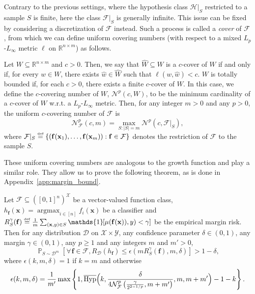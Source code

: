 \documentclass[twoside,11pt]{article}
\newcommand{\Id}[1]{\mathds{1}\hspace{-2.5pt}\left[#1\right]}
\let\oldforall=\forall
\renewcommand{\forall}{\hspace{1pt}\oldforall\hspace{1pt}}
\newcommand{\pr}[1]{\left(#1\right)}
\newcommand{\cb}[1]{\left\{#1\right\}}
\newcommand{\abs}[1]{\left|#1\right|}
\newcommand{\D}{\mathcal{D}}
\newcommand{\F}{\mathcal{F}}
\newcommand{\f}{\mathbf{f}}
\renewcommand{\H}{{\mathcal{H}}}
\newcommand{\N}{\mathcal{N}}
\newcommand{\x}{\mathbf{x}}
\newcommand{\X}{\mathcal{X}}
\newcommand{\Y}{\mathcal{Y}}
\newcommand{\reals}{\mathds{R}}
\newcommand{\eqdef}{\overset{\smash{\mbox{\tiny \rm def}}}{=}}
\DeclareMathOperator*{\Prob}{\mathds{P}}
\newcommand{\prob}[2]{\Prob_{#1}\left[#2\right]}
\DeclareMathOperator*{\argmax}{argmax}
\newcommand{\HypInv}{\overline{\textnormal{Hyp}}}
\begin{document}
Contrary to the previous settings, where the hypothesis class $\H|_S$ restricted to a sample $S$ is finite, here the class $\F|_S$ is generally infinite.
This issue can be fixed by considering a discretization of $\F$ instead.
Such a process is called a \emph{cover} of $\F$, from which we can define uniform covering numbers (with respect to a mixed $L_p$-$L_\infty$ metric $\ell$ on $\reals^{n \times m}$) as follows.
\begin{definition}
Let $W \subseteq \reals^{n \times m}$ and $c > 0$.
Then, we say that $\widehat{W} \subseteq W$ is a $c$-cover of $W$ if and only if, for every $w \in W$, there exists $\widehat{w} \in \widehat{W}$ such that $\ell(w,\widehat{w}) < c$.
$W$ is totally bounded if, for each $c > 0$, there exists a finite $c$-cover of $W$.
In this case, we define the $c$-covering number of $W$, $\N^p(c, W)$, to be the minimum cardinality of a $c$-cover of $W$ w.r.t. a $L_p$-$L_\infty$ metric. 
Then, for any integer $m>0$ and any $p > 0$, the uniform $c$-covering number of $\F$ is
\begin{equation*}
    \N^p_\F(c, m) =\! \max_{S:\abs{S} =m} \N^p(c, \F|_S),
\end{equation*}
where $\F|_S\eqdef \{ (\f(\x_1),\dots,\f(\x_m)) : \f \in \F \}$ denotes the restriction of $\F$ to the sample $S$.
\end{definition}
These uniform covering numbers are analogous to the growth function and play a similar role.
They allow us to prove the following theorem, as is done in Appendix~\ref{app:margin_bound}.

\begin{theorem}\label{thm:margin_bound}
Let $\F \subseteq ([0,1]^n)^\X$ be a vector-valued function class, $h_\f(\x) = \argmax_{i\in[n]} f_i(\x)$ be a classifier and $R^\gamma_S(\f) \eqdef \frac{1}{m} \sum_{(\x,y)\in S} \Id{\mu(\f(\x)),y) < \gamma}$ be the empirical margin risk.
Then for any distribution $\D$ on $\X \times \Y$, any confidence parameter $\delta \in (0, 1)$, any margin $\gamma \in (0,1)$, any $p\ge1$ and any integers $m$ and $m' > 0$,
\begin{equation*}
\prob{S\sim \D^m}{ \forall \f \in \F, R_\D(h_\f) \leq \epsilon(m R^\gamma_S(\f), m, \delta) } > 1 - \delta,
\end{equation*}
where $\epsilon(k,m,\delta) = 1$ if $k=m$ and otherwise
\begin{equation*}
\epsilon(k, m, \delta) = \frac{1}{m'} \max\cb{ 1, \HypInv\Bigl(k, \frac{\delta}{4 \N^p_\F\pr{\frac{\gamma}{2^{2 - 1/p}}, m + m'}}, m, m + m'\Bigr) - 1 - k }.
\end{equation*}
\end{theorem}
\end{document}
